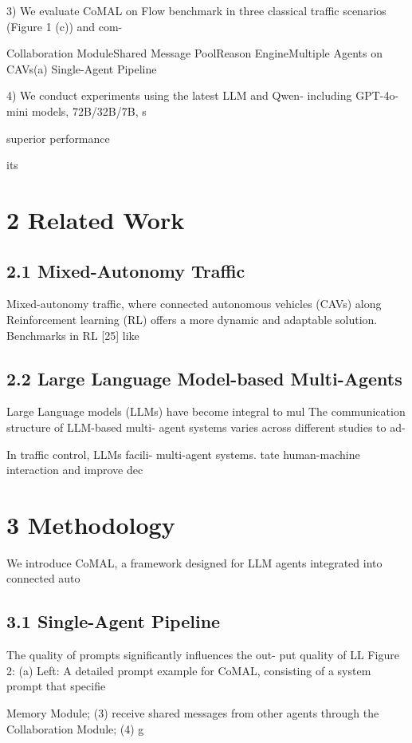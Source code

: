 \documentclass[12pt]{article}
\begin{document}
3) We evaluate CoMAL on Flow benchmark in three
classical traffic scenarios (Figure 1 (c)) and com-


Collaboration ModuleShared Message PoolReason EngineMultiple Agents on CAVs(a) Single-Agent Pipeline


4) We conduct experiments using the latest LLM
and Qwen-
including GPT-4o-mini
models,
72B/32B/7B,
s


superior performance


its


\section{2 Related Work}


\subsection{2.1 Mixed-Autonomy Traffic}

Mixed-autonomy traffic, where connected autonomous
vehicles (CAVs) along
Reinforcement learning (RL) offers a more dynamic
and adaptable solution. Benchmarks in RL [25] like


\subsection{2.2 Large Language Model-based Multi-Agents}

Large Language models (LLMs) have become integral
to mul
The communication structure of LLM-based multi-
agent systems varies across different studies to ad-


In traffic control, LLMs facili-
multi-agent systems.
tate human-machine interaction and improve dec


\section{3 Methodology}

We introduce CoMAL, a framework designed for LLM
agents integrated into connected auto
\subsection{3.1 Single-Agent Pipeline}

The quality of prompts significantly influences the out-
put quality of LL
Figure 2: (a) Left: A detailed prompt example for CoMAL, consisting of a system prompt that specifie


Memory Module; (3) receive shared messages from other
agents through the Collaboration Module; (4) g
\end{document}
